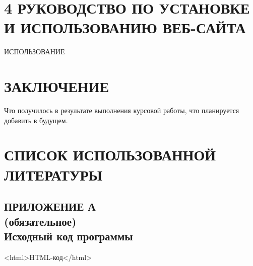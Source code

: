 \documentclass[14pt,a4paper]{extreport}
\begin{document}
	\newpage
	\section*{\normalsize\hspace{4ex}4 РУКОВОДСТВО ПО УСТАНОВКЕ И ИСПОЛЬЗОВАНИЮ ВЕБ-САЙТА}
	\hspace{4ex}ИСПОЛЬЗОВАНИЕ
	\newpage
	\section*{\center\normalsize ЗАКЛЮЧЕНИЕ \endcenter}
	\hspace{4ex}Что получилось в результате выполнения курсовой работы, что планируется добавить в будущем.
	\newpage
	\section*{\center\normalsize СПИСОК ИСПОЛЬЗОВАННОЙ ЛИТЕРАТУРЫ \endcenter}
	\begin{landscape}
	\newpage
	\section*{\center\normalsize ПРИЛОЖЕНИЕ А\\(обязательное)\\Исходный код программы \endcenter}
	<html>HTML-код</html>
	\end{landscape}
	
	
\end{document}
